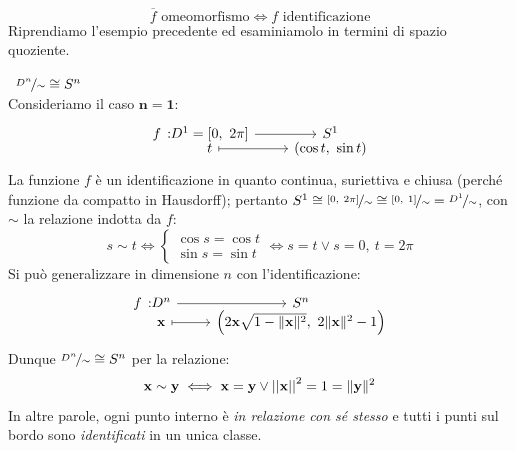 	\begin{minipage}[t]{0.16\textwidth}\vspace{-1pt}
	\end{minipage}\vspace{-1.5mm}\\
\begin{equation}
	\overline{f} \text{ omeomorfismo} \iff f \text{ identificazione}
\end{equation}
\vspace{-1.5mm}\noindent Riprendiamo l'esempio precedente ed esaminiamolo in termini di spazio quoziente.
\begin{example}~{$\nicefrac{D^n}{\sim}\cong S^n$}\\
	Consideriamo il caso $\mathbf{n=1}$:
	\begin{equation*}
		\funztot f {D^1=[0, \ 2\pi]} {S^1} t {(\cos t, \ \sin t)}
	\end{equation*}
	La funzione $f$ è un identificazione in quanto continua, suriettiva e chiusa (perché funzione da compatto in Hausdorff); pertanto $S^1\cong \nicefrac{[0, \ 2\pi]}{\sim}\cong \nicefrac{[0, \ 1]}{\sim}=\nicefrac{D^1}{\sim}$, con $\sim$ la relazione indotta da $f$:
	\begin{equation*}
		 s\sim t \iff \begin{cases}
			\cos s=\cos t \\
			\sin s =\sin t
		\end{cases} \iff s=t  \vee s=0,\ t=2\pi
	\end{equation*}
	Si può generalizzare in dimensione $n$ con l'identificazione:
	\begin{equation*}
		\funztot f {D^n} {S^n} {\mathbf{x}} {\left( 2\mathbf{x}\sqrt{1- \| \mathbf{x} \|^2}, \ 2\| \mathbf{x}\|^2 -1 \right)}
	\end{equation*}
	Dunque $\nicefrac{D^n}{\sim}\cong S^n$ per la relazione:
\begin{equation*}
	\mathbf{x}\sim \mathbf{y} \iff \mathbf{x}=\mathbf{y} \vee \left|\left| \mathbf{x} \right|\right| ^2 = 1 = \| \mathbf{y} \| ^2
\end{equation*}
	In altre parole, ogni punto interno è \textit{in relazione con sé stesso} e tutti i punti sul bordo sono \textit{identificati} in un unica classe.
\end{example}
	
